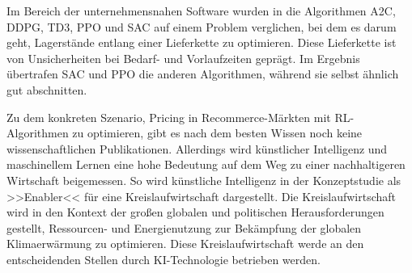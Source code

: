 Im Bereich der unternehmensnahen Software wurden in \cite{10.1007/978-3-030-87897-9_21} die Algorithmen A2C, DDPG, TD3, PPO und SAC auf einem Problem verglichen, bei dem es darum geht, Lagerstände entlang einer Lieferkette zu optimieren.
Diese Lieferkette ist von Unsicherheiten  bei Bedarf- und Vorlaufzeiten geprägt.
Im Ergebnis übertrafen SAC und PPO die anderen Algorithmen, während sie selbst ähnlich gut abschnitten.

Zu dem konkreten Szenario, Pricing in Recommerce-Märkten mit RL-Algorithmen zu optimieren, gibt es nach dem besten Wissen noch keine wissenschaftlichen Publikationen.
Allerdings wird künstlicher Intelligenz und maschinellem Lernen eine hohe Bedeutung auf dem Weg zu einer nachhaltigeren Wirtschaft beigemessen.
So wird künstliche Intelligenz in der Konzeptstudie \cite{Jose2020} als >>Enabler<< für eine Kreislaufwirtschaft dargestellt.
Die Kreislaufwirtschaft wird in den Kontext der großen globalen und politischen Herausforderungen gestellt, Ressourcen- und Energienutzung zur Bekämpfung der globalen Klimaerwärmung zu optimieren.
Diese Kreislaufwirtschaft werde an den entscheidenden Stellen durch KI-Technologie betrieben werden.